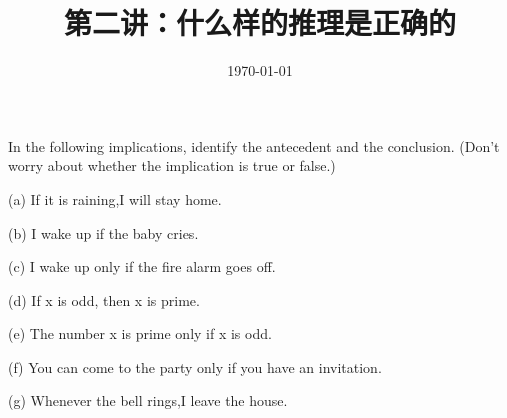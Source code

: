 \documentclass[11pt, a4paper, UTF8]{ctexart}
\title{第二讲：什么样的推理是正确的}
\date{\today}     %
\begin{document}
\maketitle
\noplagiarism	%
\beginthishw	%

\begin{problem}[UD: 2.1]	%
In the following implications, identify the antecedent and the conclusion. (Don’t worry about whether the implication is true or false.)

(a) If it is raining,I will stay home.

(b) I wake up if the baby cries.

(c) I wake up only if the fire alarm goes off. 

(d) If x is odd, then x is prime.

(e) The number x is prime only if x is odd.

(f) You can come to the party only if you have an invitation. 

(g) Whenever the bell rings,I leave the house.
\end{problem}
\end{document}
